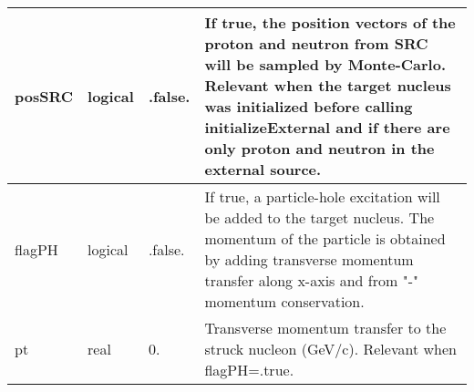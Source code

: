 \documentclass{article}
\begin{document}
\begin{longtable}{llll}
\midrule
posSRC & \begin{minipage}[t]{2cm}logical\end{minipage} & \begin{minipage}[t]{2cm}.false.\end{minipage} & \begin{minipage}[t]{12cm}If true, the position vectors of the proton and neutron from SRC will be sampled by Monte-Carlo. Relevant when the target nucleus was initialized before calling initializeExternal and if there are only proton and neutron in the external source.\end{minipage}\\*
\midrule
flagPH & \begin{minipage}[t]{2cm}logical\end{minipage} & \begin{minipage}[t]{2cm}.false.\end{minipage} & \begin{minipage}[t]{12cm}If true, a particle-hole excitation will be added to the target nucleus. The momentum of the particle is obtained by adding transverse momentum transfer along x-axis and from "-" momentum conservation.\end{minipage}\\*
\midrule
pt & \begin{minipage}[t]{2cm}real\end{minipage} & \begin{minipage}[t]{2cm}0.\end{minipage} & \begin{minipage}[t]{12cm}Transverse momentum transfer to the struck nucleon (GeV/c). Relevant when flagPH=.true.\end{minipage}\\*
\bottomrule
\end{longtable}
{ }



\end{document}
